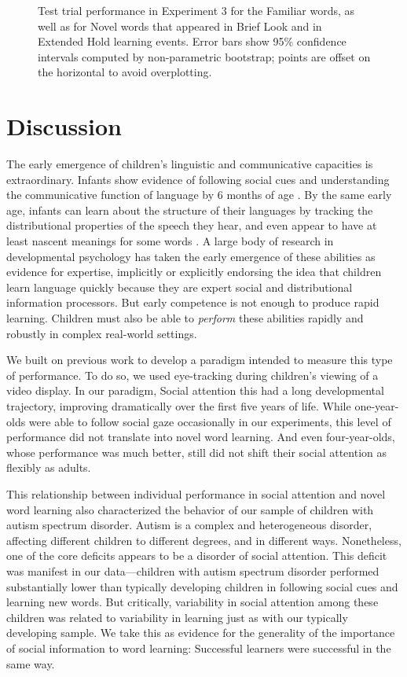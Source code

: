 \documentclass[jou,floatsintext]{apa6}
\begin{document}
\begin{figure}[tb]
	\caption{\label{fig:soc_word_test}Test trial performance in Experiment 3 for the Familiar words, as well as for Novel words that appeared in Brief Look and in Extended Hold learning events. Error bars show 95\% confidence intervals computed by non-parametric bootstrap; points are offset on the horizontal to avoid overplotting.}
\end{figure}


\section{Discussion}

The early emergence of children's linguistic and communicative capacities is extraordinary. Infants show evidence of following social cues and understanding the communicative function of language by 6 months of age \cite{senju2008, vouloumanos2014}. By the same early age, infants can learn about the structure of their languages by tracking the distributional properties of the speech they hear, and even appear to have at least nascent meanings for some words \cite{thiessen2003, bergelson2012}. A large body of research in developmental psychology has taken the early emergence of these abilities as evidence for expertise, implicitly or explicitly endorsing the idea that children learn language quickly because they are expert social and distributional information processors. But early competence is not enough to produce rapid learning. Children must also be able to \emph{perform} these abilities rapidly and robustly in complex real-world settings.

We built on previous work to develop a paradigm intended to measure this type of performance. To do so, we used eye-tracking during children’s viewing of a video display. In our paradigm,
Social attention this had a long developmental trajectory, improving dramatically over the first five years of life. While one-year-olds were able to follow social gaze occasionally in our experiments, this level of performance did not translate into novel word learning. And even four-year-olds, whose performance was much better, still did not shift their social attention as flexibly as adults.

This relationship between individual performance in social attention and novel word learning also characterized the behavior of our sample of children with autism spectrum disorder. Autism is a complex and heterogeneous disorder, affecting different children to different degrees, and in different ways. Nonetheless, one of the core deficits appears to be a disorder of social attention. This deficit was manifest in our data---children with autism spectrum disorder performed substantially lower than typically developing children in following social cues and learning new words. But critically, variability in social attention among these children was related to variability in learning just as with our typically developing sample.  We take this as evidence for the generality of the importance of social information to word learning: Successful learners were successful in the same way.
\end{document}
